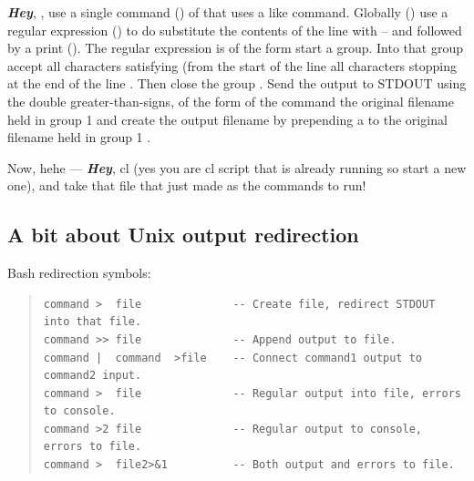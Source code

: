 \documentclass[letter,11pt,oneside]{article}
\begin{document}
\textbf{\emph{Hey}}, {\color{verbcolor}{\verb#sed#}}, use a single
command ({\color{verbcolor}{\verb#-e#}}) of
{\color{verbcolor}{\verb#'s/\(^.*$\)/crmedian \1 c_\1/'#}} that uses a
{\color{verbcolor}{\verb#g/re/p#}} like command. Globally
({\color{verbcolor}{\verb#g#}}) use a regular expression
({\color{verbcolor}{\verb#re#}}) {\color{verbcolor}{\verb#\(^.*$\)#}}
to do substitute the contents of the line with
{\color{verbcolor}{\verb#crmedian \1 c_\1#}} -- and followed by a
print ({\color{verbcolor}{\verb#p#}}).  The regular expression is of
the form {\color{verbcolor}{\verb#\(#}} start a group.  Into that
group accept all characters satisfying
{\color{verbcolor}{\verb#^.*$#}} (from the start of the line
{\color{verbcolor}{\verb#^#}} all characters
{\color{verbcolor}{\verb#.*#}} stopping at the end of the line
{\color{verbcolor}{\verb#$#}}. Then close the group
{\color{verbcolor}{\verb#\)#}}. Send the output to STDOUT using the
double greater-than-signs, of the form of the command
{\color{verbcolor}{\verb#crmedian#}} the original filename held in
group 1 {\color{verbcolor}{\verb#\1#}} and create the output filename
by prepending a {\color{verbcolor}{\verb#c_#}} to the original
filename held in group 1 {\color{verbcolor}{\verb#c_\1#}}.

Now, hehe --- \textbf{\emph{Hey}}, cl (yes you are cl script that is already running so
start a new one), and take that file that {\color{verbcolor}{\verb#sed#}}
just made as the commands to run!


\clearpage
\subsection{A bit about Unix output redirection}

Bash redirection symbols:

{\color{verbcolor}
\begin{quote}
\begingroup \fontsize{10pt}{10pt}
\selectfont
\begin{verbatim}
command >  file              -- Create file, redirect STDOUT into that file.
command >> file              -- Append output to file.
command |  command  >file    -- Connect command1 output to command2 input.
command >  file              -- Regular output into file, errors to console.
command >2 file              -- Regular output to console, errors to file.
command >  file2>&1          -- Both output and errors to file.
\end{verbatim}
\endgroup
\end{quote}
}
\end{document}
